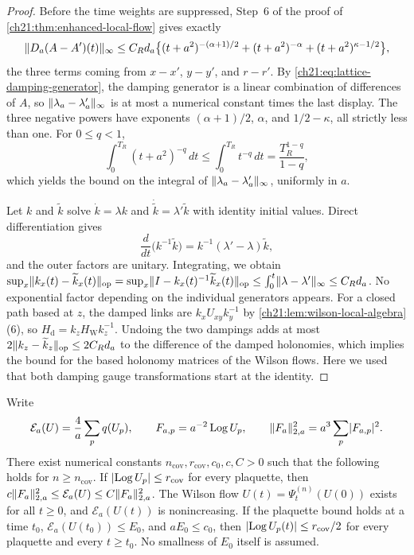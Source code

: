 \begin{proof}
Before the time weights are suppressed, Step~6 of the proof of \cref{ch21:thm:enhanced-local-flow} gives exactly
\[
 \lVert D_a(A-A')(t)\rVert_\infty\le C_Rd_a\bigl\{(t+a^2)^{-(\alpha+1)/2}+(t+a^2)^{-\alpha}+(t+a^2)^{\kappa-1/2}\bigr\},
\]
the three terms coming from $x-x'$, $y-y'$, and $r-r'$. By \eqref{ch21:eq:lattice-damping-generator}, the damping generator is a linear combination of differences of $A$, so $\lVert \lambda_a-\lambda'_a\rVert_\infty$ is at most a numerical constant times the last display. The three negative powers have exponents $(\alpha+1)/2$, $\alpha$, and $1/2-\kappa$, all strictly less than one. For $0\le q<1$,
\[
 \int_0^{T_R}(t+a^2)^{-q}\,dt\le\int_0^{T_R}t^{-q}\,dt=\frac{T_R^{1-q}}{1-q},
\]
which yields the bound on the integral of $\lVert \lambda_a-\lambda'_a\rVert_\infty$, uniformly in $a$.

Let $k$ and $\widetilde k$ solve $\dot k=\lambda k$ and $\dot{\widetilde k}=\lambda'\widetilde k$ with identity initial values. Direct differentiation gives
\[
 \frac{d}{dt}\bigl(k^{-1}\widetilde k\bigr)=k^{-1}(\lambda'-\lambda)\widetilde k,
\]
and the outer factors are unitary. Integrating, we obtain $\sup_x\lVert k_x(t)-\widetilde k_x(t)\rVert_{\mathrm{op}}=\sup_x\lVert I-k_x(t)^{-1}\widetilde k_x(t)\rVert_{\mathrm{op}}\le\int_0^t\lVert \lambda-\lambda'\rVert_\infty\le C_Rd_a$. No exponential factor depending on the individual generators appears. For a closed path based at $z$, the damped links are $k_xU_{xy}k_y^{-1}$ by \cref{ch21:lem:wilson-local-algebra}(6), so $H_{\mathrm d}=k_zH_{\mathrm W}k_z^{-1}$. Undoing the two dampings adds at most $2\lVert k_z-\widetilde k_z\rVert_{\mathrm{op}}\le2C_Rd_a$ to the difference of the damped holonomies, which implies the bound for the based holonomy matrices of the Wilson flows. Here we used that both damping gauge transformations start at the identity.
\end{proof}

\begin{lemma}\label{ch21:lem:lattice-energy}
Write
\[
 \mathcal E_a(U)=\frac4a\sum_pq(U_p),\qquad F_{a,p}=a^{-2}\operatorname{Log} U_p,\qquad \lVert F_a\rVert_{2,a}^2=a^3\sum_p\lvert F_{a,p}\rvert^2 .
\]
There exist numerical constants $n_{\mathrm{cov}},r_{\mathrm{cov}},c_0,c,C>0$ such that the following holds for $n\ge n_{\mathrm{cov}}$. If $\lvert \operatorname{Log} U_p\rvert\le r_{\mathrm{cov}}$ for every plaquette, then $c\lVert F_a\rVert_{2,a}^2\le\mathcal E_a(U)\le C\lVert F_a\rVert_{2,a}^2$. The Wilson flow $U(t)=\Psi^{(n)}_t(U(0))$ exists for all $t\ge0$, and $\mathcal E_a(U(t))$ is nonincreasing. If the plaquette bound holds at a time $t_0$, $\mathcal E_a(U(t_0))\le E_0$, and $aE_0\le c_0$, then $\lvert \operatorname{Log} U_p(t)\rvert\le r_{\mathrm{cov}}/2$ for every plaquette and every $t\ge t_0$. No smallness of $E_0$ itself is assumed.
\end{lemma}

